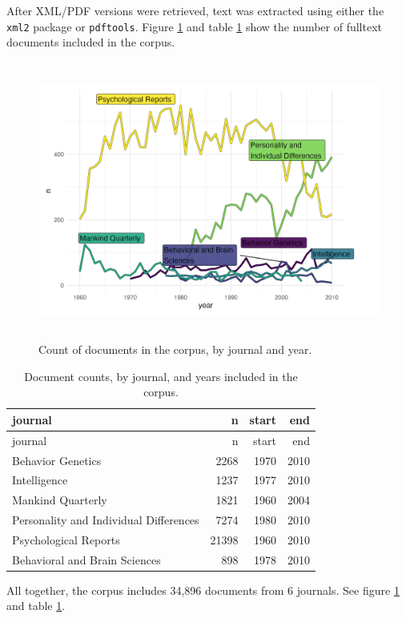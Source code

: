 \documentclass[12pt]{article}
\begin{document}
After XML/PDF versions were retrieved, text was extracted using either the \texttt{xml2} package \cite{WickhamXml2ParseXML2023} or \texttt{pdftools}. Figure \ref{fig:counts} and table \ref{tab:counts} show the number of fulltext documents included in the corpus.

\begin{figure}
\centering
\includegraphics[width=4.76in,height=3.6in]{img/02_count.png}
\caption{Count of documents in the corpus, by journal and year. \label{fig:counts}}
\end{figure}

\begin{longtable}[]{@{}lrrr@{}}
\caption{\label{tab:counts} Document counts, by journal, and years included in the corpus.}\tabularnewline
\toprule
journal & n & start & end \\
\midrule
\endfirsthead
\toprule
journal & n & start & end \\
\midrule
\endhead
Behavior Genetics & 2268 & 1970 & 2010 \\
Intelligence & 1237 & 1977 & 2010 \\
Mankind Quarterly & 1821 & 1960 & 2004 \\
Personality and Individual Differences & 7274 & 1980 & 2010 \\
Psychological Reports & 21398 & 1960 & 2010 \\
Behavioral and Brain Sciences & 898 & 1978 & 2010 \\
\bottomrule
\end{longtable}

All together, the corpus includes 34,896 documents from 6 journals. See figure \ref{fig:counts} and table \ref{tab:counts}.
\end{document}
